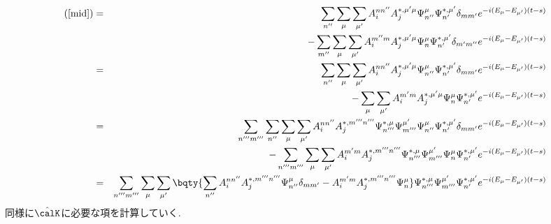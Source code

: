 \documentclass[10.5pt,a4paper]{jreport}
\begin{document}
\begin{eqnarray}
  \nonumber(\ref{mid}) &=&\sum_{n''}\sum_{\mu}\sum_{\mu'}A_i^{nn''}A_j^{*, \mu'\mu}\Psi_{n''}^{\mu}\Psi_{n'}^{*, \mu'}\delta_{mm'}e^{-i(E_\mu - E_{\mu'})(t-s)}\\
  &&- \sum_{m''}\sum_{\mu}\sum_{\mu'}A_i^{m''m}A_j^{*, \mu'\mu}\Psi_{n}^{\mu}\Psi_{n'}^{*, \mu'}\delta_{m'm''}e^{-i(E_\mu - E_{\mu'})(t-s)}\\
  \nonumber &=&\sum_{n''}\sum_{\mu}\sum_{\mu'}A_i^{nn''}A_j^{*, \mu'\mu}\Psi_{n''}^{\mu}\Psi_{n'}^{*, \mu'}\delta_{mm'}e^{-i(E_\mu - E_{\mu'})(t-s)}\\
  &&- \sum_{\mu}\sum_{\mu'}A_i^{m'm}A_j^{*, \mu'\mu}\Psi_{n}^{\mu}\Psi_{n'}^{*, \mu'}e^{-i(E_\mu - E_{\mu'})(t-s)}\\
  \nonumber &=&\sum_{n'''m'''}\sum_{n''}\sum_{\mu}\sum_{\mu'}A_i^{nn''}A_j^{*, m'''n'''}\Psi_{n'''}^{*, \mu}\Psi_{m'''}^{\mu'}\Psi_{n''}^{\mu}\Psi_{n'}^{*, \mu'}\delta_{mm'}e^{-i(E_\mu - E_{\mu'})(t-s)}\\
  &&- \sum_{n'''m'''}\sum_{\mu}\sum_{\mu'}A_i^{m'm}A_j^{*, m'''n'''}\Psi_{n'''}^{*, \mu}\Psi_{m'''}^{\mu'}\Psi_{n}^{\mu}\Psi_{n'}^{*, \mu'}e^{-i(E_\mu - E_{\mu'})(t-s)}\\
  \nonumber &=&\sum_{n'''m'''}\sum_{\mu}\sum_{\mu'}\bqty{\sum_{n''}A_i^{nn''}A_j^{*, m'''n'''}\Psi_{n''}^{\mu}\delta_{mm'}- A_i^{m'm}A_j^{*, m'''n'''}\Psi_{n}^{\mu}}\Psi_{n'''}^{*, \mu}\Psi_{m'''}^{\mu'}\Psi_{n'}^{*, \mu'}e^{-i(E_\mu - E_{\mu'})(t-s)}\label{end1}\\
\end{eqnarray}
同様に$\hat{\calK}$に必要な項を計算していく.

\end{document}
